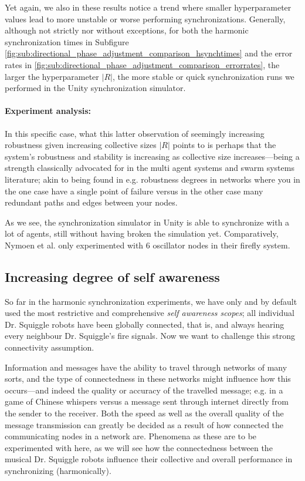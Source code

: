 		Yet again, we also in these results notice a trend where smaller hyperparameter values lead to more unstable or worse performing synchronizations. Generally, although not strictly nor without exceptions, for both the harmonic synchronization times in Subfigure \ref{fig:sub:directional_phase_adjustment_comparison_hsynchtimes} and the error rates in \ref{fig:sub:directional_phase_adjustment_comparison_errorrates}, the larger the hyperparameter $|R|$, the more stable or quick synchronization runs we performed in the Unity synchronization simulator. 
		
		\paragraph{Experiment analysis:\nl}
		
		In this specific case, what this latter observation of seemingly increasing robustness given increasing collective sizes $|R|$ points to is perhaps that the system's robustness and stability is increasing as collective size increases—being a strength classically advocated for in the multi agent systems and swarm systems literature; akin to being found in e.g. robustness degrees in networks where you in the one case have a single point of failure versus in the other case many redundant paths and edges between your nodes.
		
		As we see, the synchronization simulator in Unity is able to synchronize with a lot of agents, still without having broken the simulation yet. Comparatively, Nymoen et al. \cite{nymoen_synch} only experimented with 6 oscillator nodes in their firefly system.


	\subsection{Increasing degree of self awareness}
	\label{exp:phasesync:increasing_SA_deg}
	
	So far in the harmonic synchronization experiments, we have only and by default used the most restrictive and comprehensive \textit{self awareness scopes}; all individual Dr. Squiggle robots have been globally connected, that is, and always hearing every neighbour Dr. Squiggle's fire signals. Now we want to challenge this strong connectivity assumption.
	
	Information and messages have the ability to travel through networks of many sorts, and the type of connectedness in these networks might influence how this occurs—and indeed the quality or accuracy of the travelled message; e.g. in a game of Chinese whispers versus a message sent through internet directly from the sender to the receiver. Both the speed as well as the overall quality of the message transmission can greatly be decided as a result of how connected the communicating nodes in a network are. Phenomena as these are to be experimented with here, as we will see how the connectedness between the musical Dr. Squiggle robots influence their collective and overall performance in synchronizing (harmonically).
	
